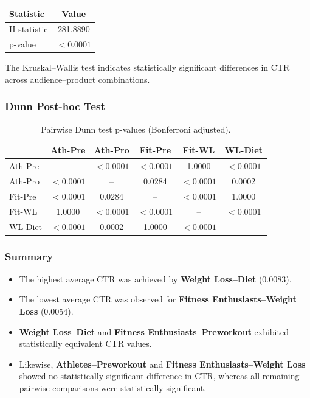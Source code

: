 \begin{table}[H]
	\centering
	\begin{tabular}{lc}
		\toprule
		Statistic & Value \\
		\midrule
		H-statistic & 281.8890 \\
		p-value & $<0.0001$ \\
		\bottomrule
	\end{tabular}
\end{table}

The Kruskal--Wallis test indicates statistically significant differences in CTR across audience--product combinations.

\vspace{0.3cm}

\subsubsection{Dunn Post-hoc Test}

\begin{table}[H]
	\centering
	\caption{Pairwise Dunn test p-values (Bonferroni adjusted).}
	\begin{tabular}{lccccc}
		\toprule
		& Ath-Pre & Ath-Pro & Fit-Pre & Fit-WL & WL-Diet \\
		\midrule
		Ath-Pre & -- & $<0.0001$ & $<0.0001$ & 1.0000 & $<0.0001$ \\
		Ath-Pro & $<0.0001$ & -- & 0.0284 & $<0.0001$ & 0.0002 \\
		Fit-Pre & $<0.0001$ & 0.0284 & -- & $<0.0001$ & 1.0000 \\
		Fit-WL & 1.0000 & $<0.0001$ & $<0.0001$ & -- & $<0.0001$ \\
		WL-Diet & $<0.0001$ & 0.0002 & 1.0000 & $<0.0001$ & -- \\
		\bottomrule
	\end{tabular}
\end{table}

\subsubsection{Summary}

\begin{itemize}
	\item The highest average CTR was achieved by \textbf{Weight Loss--Diet} (0.0083).
	\item The lowest average CTR was observed for \textbf{Fitness Enthusiasts--Weight Loss} (0.0054).
	\item \textbf{Weight Loss--Diet} and \textbf{Fitness Enthusiasts--Preworkout} exhibited statistically equivalent CTR values.
	\item Likewise, \textbf{Athletes--Preworkout} and \textbf{Fitness Enthusiasts--Weight Loss} showed no statistically significant difference in CTR, whereas all remaining pairwise comparisons were statistically significant.
\end{itemize}



